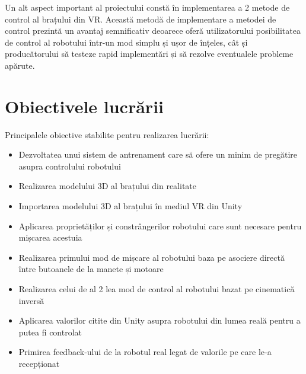 Un alt aspect important al proiectului constă în implementarea a 2 metode de control al brațului din VR. Această metodă de implementare a metodei de control prezintă un avantaj semnificativ deoarece oferă utilizatorului posibilitatea de control al robotului într-un mod simplu și ușor de înțeles, cât și producătorului să testeze rapid implementări și să rezolve eventualele probleme apărute.



\clearpage

\section{Obiectivele lucrării}

Principalele obiective stabilite pentru realizarea lucrării:
\begin{itemize}
	\item Dezvoltatea unui sistem de antrenament care să ofere un minim de pregătire asupra controlului robotului
	\item Realizarea modelului 3D al brațului din realitate
	\item Importarea modelului 3D al brațului în mediul VR din Unity
	\item Aplicarea proprietăților și constrângerilor robotului care sunt necesare pentru mișcarea acestuia
	\item Realizarea primului mod de mișcare al robotului baza pe asociere directă între butoanele de la manete și motoare
	\item Realizarea celui de al 2 lea mod de control al robotului bazat pe cinematică inversă
	\item Aplicarea valorilor citite din Unity asupra robotului din lumea reală pentru a putea fi controlat
	\item Primirea feedback-ului de la robotul real legat de valorile pe care le-a recepționat
\end{itemize}


\clearpage


